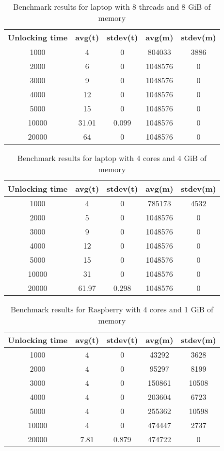 \documentclass[nolof]{fithesis3}
\begin{document}
\noindent
\begin{table}
\caption{Benchmark results for laptop with 8 threads and 8 GiB of memory}
\label{tab:l8c4g}
\begin{tabularx}{\textwidth}{| c | c | c | c | c |}
\hline
Unlocking time & avg(t) & stdev(t) & avg(m) & stdev(m)\\
\hline
1000 & 4 & 0 & 804033 & 3886\\
\hline
2000 & 6 & 0 & 1048576 & 0\\
\hline
3000 & 9 & 0 & 1048576 & 0\\
\hline
4000 & 12 & 0 & 1048576 & 0\\
\hline
5000 & 15 & 0 & 1048576 & 0\\
\hline
10000 & 31.01 & 0.099 & 1048576 & 0\\
\hline
20000 & 64 & 0 & 1048576 & 0\\
\hline
\end{tabularx}
\end{table}

\noindent
\begin{table}
\caption{Benchmark results for laptop with 4 cores and 4 GiB of memory}
\label{tab:l4c4g}
\begin{tabularx}{\textwidth}{| c | c | c | c | c |}
\hline
Unlocking time & avg(t) & stdev(t) & avg(m) & stdev(m)\\
\hline
1000 & 4 & 0 & 785173 & 4532\\
\hline
2000 & 5 & 0 & 1048576 & 0\\
\hline
3000 & 9 & 0 & 1048576 & 0\\
\hline
4000 & 12 & 0 & 1048576 & 0\\
\hline
5000 & 15 & 0 & 1048576 & 0\\
\hline
10000 & 31 & 0 & 1048576 & 0\\
\hline
20000 & 61.97 & 0.298 & 1048576 & 0\\
\hline
\end{tabularx}
\end{table}

\noindent
\begin{table}
\caption{Benchmark results for Raspberry with 4 cores and 1 GiB of memory}
\label{tab:r4c1g}
\begin{tabularx}{\textwidth}{| c | c | c | c | c |}
\hline
Unlocking time & avg(t) & stdev(t) & avg(m) & stdev(m)\\
\hline
1000 & 4 & 0 & 43292 & 3628\\
\hline
2000 & 4 & 0 & 95297 & 8199\\
\hline
3000 & 4 & 0 & 150861 & 10508\\
\hline
4000 & 4 & 0 & 203604 & 6723\\
\hline
5000 & 4 & 0 & 255362 & 10598\\
\hline
10000 & 4 & 0 & 474447 & 2737\\
\hline
20000 & 7.81 & 0.879 & 474722 & 0\\
\hline
\end{tabularx}
\end{table}
\end{document}
